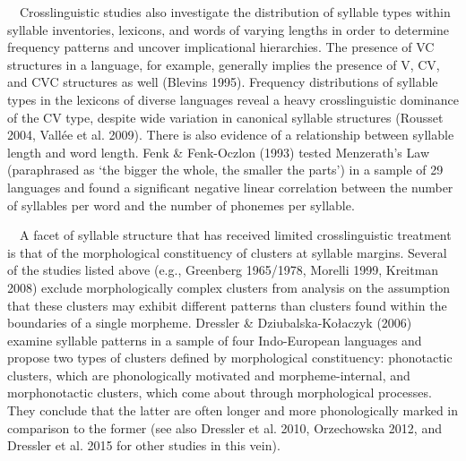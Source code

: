 \documentclass[12pt]{article}
\newenvironment{styleBody}{\renewcommand\baselinestretch{1.0}\setlength\leftskip{0in}\setlength\rightskip{0in plus 1fil}\setlength\parindent{0in}\setlength\parfillskip{0pt plus 1fil}\setlength\parskip{0in plus 1pt}\writerlistparindent\writerlistleftskip\leavevmode\normalfont\normalsize\fontsize{11pt}{13.2pt}\selectfont\mdseries\upshape\writerlistlabel\ignorespaces}{\unskip\vspace{0in plus 1pt}\par}
\newcommand\writerlistleftskip{}
\newcommand\writerlistparindent{}
\newcommand\writerlistlabel{}
\begin{document}
\begin{styleBody}
\ \ Crosslinguistic studies also investigate the distribution of syllable types within syllable inventories, lexicons, and words of varying lengths in order to determine frequency patterns and uncover implicational hierarchies. The presence of VC structures in a language, for example, generally implies the presence of V, CV, and CVC structures as well (Blevins 1995). Frequency distributions of syllable types in the lexicons of diverse languages reveal a heavy crosslinguistic dominance of the CV type, despite wide variation in canonical syllable structures (Rousset 2004, Vallée et al. 2009). There is also evidence of a relationship between syllable length and word length. Fenk \& Fenk-Oczlon (1993) tested Menzerath’s Law (paraphrased as ‘the bigger the whole, the smaller the parts’) in a sample of 29 languages and found a significant negative linear correlation between the number of syllables per word and the number of phonemes per syllable.
\end{styleBody}

\begin{styleBody}
\ \ A facet of syllable structure that has received limited crosslinguistic treatment is that of the morphological constituency of clusters at syllable margins. Several of the studies listed above (e.g., Greenberg 1965/1978, Morelli 1999, Kreitman 2008) exclude morphologically complex clusters from analysis on the assumption that these clusters may exhibit different patterns than clusters found within the boundaries of a single morpheme. Dressler \& Dziubalska-Kołaczyk (2006) examine syllable patterns in a sample of four Indo-European languages and propose two types of clusters defined by morphological constituency: phonotactic clusters, which are phonologically motivated and morpheme-internal, and morphonotactic clusters, which come about through morphological processes. They conclude that the latter are often longer and more phonologically marked in comparison to the former (see also Dressler et al. 2010, Orzechowska 2012, and Dressler et al. 2015 for other studies in this vein).
\end{styleBody}
\end{document}
